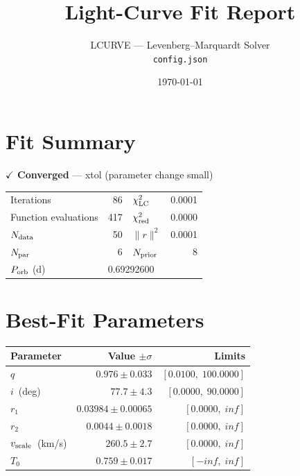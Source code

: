 \documentclass[11pt,a4paper]{article}
\title{\color{headerblue}\LARGE Light-Curve Fit Report}
\author{\textsc{LCURVE} --- Levenberg--Marquardt Solver\\[2pt]
{\small\texttt{config.json}}}
\date{\today}
\newcommand{\thead}[1]{\textbf{\color{headerfg}#1}}
\begin{document}
\maketitle
\thispagestyle{empty}

\section{Fit Summary}

\begin{tcolorbox}[colback=green!8,colframe=green!50!black,boxrule=0.5pt,arc=3pt,left=6pt,right=6pt,top=4pt,bottom=4pt]
\textbf{\color{green!50!black}\large $\checkmark$ Converged} --- xtol (parameter change small)
\end{tcolorbox}

\begin{tcolorbox}[colback=lightblue,colframe=framegray,boxrule=0.4pt,arc=2pt,left=8pt,right=8pt,top=6pt,bottom=6pt]
\begin{tabular}{l@{\hskip 1.5em}r@{\hskip 3em}l@{\hskip 1.5em}r}
Iterations & 86 & $\chi^2_{\rm LC}$ & 0.0001 \\
Function evaluations & 417 & $\chi^2_{\rm red}$ & 0.0000 \\
$N_{\rm data}$ & 50 & $\|r\|^2$ & 0.0001 \\
$N_{\rm par}$ & 6 & $N_{\rm prior}$ & 8 \\
$P_{\rm orb}$ (d) & \multicolumn{3}{l}{0.69292600} \\
\end{tabular}
\end{tcolorbox}

\section{Best-Fit Parameters}

\begin{tabular}{l r r}
\rowcolor{headerblue}
\thead{Parameter} & \thead{Value $\pm\sigma$} & \thead{Limits} \\
\toprule
$q$ & $0.976 \pm 0.033$ & $[0.0100,\;100.0000]$ \\
$i$~(deg) & $77.7 \pm 4.3$ & $[0.0000,\;90.0000]$ \\
$r_1$ & $0.03984 \pm 0.00065$ & $[0.0000,\;inf]$ \\
$r_2$ & $0.0044 \pm 0.0018$ & $[0.0000,\;inf]$ \\
$v_{\rm scale}$~(km/s) & $260.5 \pm 2.7$ & $[0.0000,\;inf]$ \\
$T_0$ & $0.759 \pm 0.017$ & $[-inf,\;inf]$ \\
\bottomrule
\end{tabular}
\end{document}
